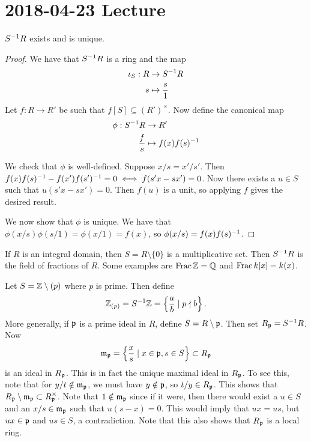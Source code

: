 \section{2018-04-23 Lecture}

\begin{prop}[2.2]
	$S^{-1} R$ exists and is unique.
\end{prop}

\begin{proof}
	We have that $S^{-1} R$ is a ring and the map
	\begin{align*}
	  \iota_S: R &\to S^{-1} R \\
	  s &\mapsto \frac{s}{1}
	\end{align*}
	Let $f: R \to R'$ be such that $f[S] \subseteq (R')^\times$.
	Now define the canonical map
	\begin{align*}
	  \phi: S^{-1} R &\to R' \\
	  \frac{f}{s} &\mapsto f(x)f(s)^{-1}
	\end{align*}

	We check that $\phi$ is well-defined.
	Suppose $x/s = x'/s'$.
	Then $f(x)f(s)^{-1}-f(x')f(s')^{-1}=0 \iff f(s'x-sx')=0$.
	Now there exists a $u \in S$ such that $u(s'x-sx')=0$.
	Then $f(u)$ is a unit, so applying $f$ gives the desired result.

	We now show that $\phi$ is unique.
	We have that $\phi(x/s)\phi(s/1) = \phi(x/1)=f(x)$, so $\phi(x/s)=f(x)f(s)^{-1}$.
\end{proof}

\begin{exam}
  \leavevmode
  \begin{enum}
    \io
    If $R$ is an integral domain, then $S = R \setminus \{0\}$ is a multiplicative set.
    Then $S^{-1} R$ is the field of fractions of $R$.
    Some examples are $\operatorname{Frac}\mathbb{Z}=\mathbb{Q}$ and $\operatorname{Frac} k[x]=k(x)$.

    \io
    Let $S=\mathbb{Z}\setminus(p)$ where $p$ is prime.
    Then define
    \[\mathbb{Z}_{(p)}=S^{-1}\mathbb{Z} = \left\{ \frac{a}{b} \mid p \nmid b \right\}.\]
    More generally, if $\mathfrak{p}$ is a prime ideal in $R$, define $S = R \setminus \mathfrak{p}$.
    Then set $R_{\mathfrak{p}} = S^{-1} R$.
    Now
    \[\mathfrak{m}_{\mathfrak{p}} = \left\{ \frac{x}{s} \mid x \in \mathfrak{p}, s \in S \right\} \subset R_{\mathfrak{p}}\]
    is an ideal in $R_{\mathfrak{p}}$.
    This is in fact the unique maximal ideal in $R_{\mathfrak{p}}$.
    To see this, note that for $y/t \notin \mathfrak{m}_{\mathfrak{p}}$, we must have $y \notin \mathfrak{p}$, so $t/y \in R_{\mathfrak{p}}$.
    This shows that $R_{\mathfrak{p}} \setminus \mathfrak{m}_{\mathfrak{p}} \subset R_{\mathfrak{p}}^\times$.
    Note that $1 \notin \mathfrak{m}_{\mathfrak{p}}$ since if it were, then there would exist a $u \in S$ and an $x/s \in \mathfrak{m}_{\mathfrak{p}}$ such that $u(s-x)=0$.
    This would imply that $ux=us$, but $ux \in \mathfrak{p}$ and $us \in S$, a contradiction.
    Note that this also shows that $R_{\mathfrak{p}}$ is a local ring.
  \end{enum}
\end{exam}

